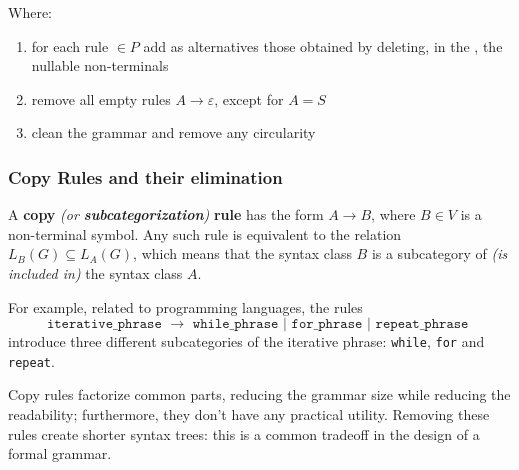 \documentclass[english]{article}
\begin{document}
Where:

\begin{enumerate}[label=row \arabic*., leftmargin=*, widest*=6, labelindent=2em]
  \item for each rule \(\in P\) add as alternatives those obtained by deleting, in the \RP, the nullable non-terminals
  \item remove all empty rules \(A \rightarrow \varepsilon\), except for \(A=S\)
  \item clean the grammar and remove any circularity
\end{enumerate}

\subsubsection{Copy Rules and their elimination}
\label{sec:copy-rules-and-their-elimination}

A \textbf{copy}\textit{ (or \textbf{subcategorization})} \textbf{rule} has the form \(A \rightarrow B\), where \(B \in V\) is a non-terminal symbol.
Any such rule is equivalent to the relation \(L_B(G) \subseteq L_A(G)\), which means that the syntax class \(B\) is a subcategory of \textit{(is included in)} the syntax class \(A\).

For example, related to programming languages, the rules
\[\texttt{iterative\_phrase } \rightarrow \texttt{ while\_phrase } | \texttt{ for\_phrase } | \texttt{ repeat\_phrase }\]
introduce three different subcategories of the iterative phrase: \texttt{while}, \texttt{for} and \texttt{repeat}.

Copy rules factorize common parts, reducing the grammar size while reducing the readability;
furthermore, they don't have any practical utility.
Removing these rules create shorter syntax trees: this is a common tradeoff in the design of a formal grammar.
\end{document}
